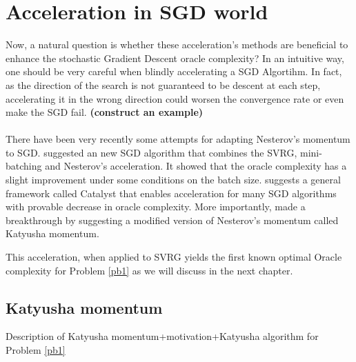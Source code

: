 \documentclass[12pt]{report}
\begin{document}
\section{Acceleration in SGD world}
Now, a natural question is whether these acceleration's methods are beneficial to enhance the stochastic Gradient Descent oracle complexity?
In an intuitive way, one should be very careful when blindly accelerating a SGD Algortihm. In fact, as the direction of the search is not guaranteed to be descent at each step, accelerating it in the wrong direction could worsen the convergence rate or even make the SGD fail. \textbf{(construct an example)}\\
\\There have been very recently some attempts for adapting Nesterov's momentum to SGD. \cite{nitanda2016accelerated} suggested an new SGD algorithm that combines the SVRG, mini-batching and Nesterov's acceleration. It showed that the oracle complexity has a slight improvement under some conditions on the batch size. \cite{lin2015universal} suggests a general framework called Catalyst that enables acceleration for many SGD algorithms with provable decrease in oracle complexity.
More importantly, \cite{allen2017katyusha} made a breakthrough by suggesting a modified version of Nesterov's momentum called Katyusha momentum.

This acceleration, when applied to SVRG yields the first known optimal Oracle complexity for Problem \ref{pb1} as we will discuss in the next chapter.
\subsection{Katyusha momentum}

Description of Katyusha momentum+motivation+Katyusha algorithm for Problem \ref{pb1}
\end{document}
